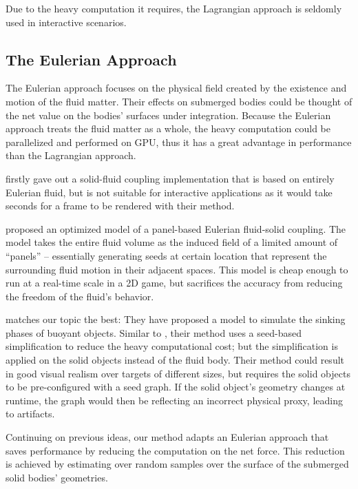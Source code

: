 Due to the heavy computation it requires, the Lagrangian approach is seldomly used in interactive scenarios.

\subsection{The Eulerian Approach}

The Eulerian approach focuses on the physical field created by the existence and motion of the fluid matter.
Their effects on submerged bodies could be thought of the net value on the bodies' surfaces under integration.
Because the Eulerian approach treats the fluid matter as a whole, the heavy computation could be parallelized and performed on GPU, thus it has a great advantage in performance than the Lagrangian approach.

\cite{teng2016eulerian} firstly gave out a solid-fluid coupling implementation that is based on entirely Eulerian fluid, but is not suitable for interactive applications as it would take seconds for a frame to be rendered with their method.

\cite{GER13} proposed an optimized model of a panel-based Eulerian fluid-solid coupling.
The model takes the entire fluid volume as the induced field of a limited amount of ``panels'' -- essentially generating seeds at certain location that represent the surrounding fluid motion in their adjacent spaces.
This model is cheap enough to run at a real-time scale in a 2D game, but sacrifices the accuracy from reducing the freedom of the fluid's behavior.

\cite{BAJ20} matches our topic the best:
They have proposed a model to simulate the sinking phases of buoyant objects.
Similar to \cite{GER13}, their method uses a seed-based simplification to reduce the heavy computational cost; but the simplification is applied on the solid objects instead of the fluid body.
Their method could result in good visual realism over targets of different sizes, but requires the solid objects to be pre-configured with a seed graph.
If the solid object's geometry changes at runtime, the graph would then be reflecting an incorrect physical proxy, leading to artifacts.

Continuing on previous ideas, our method adapts an Eulerian approach that saves performance by reducing the computation on the net force.
This reduction is achieved by estimating over random samples over the surface of the submerged solid bodies' geometries.